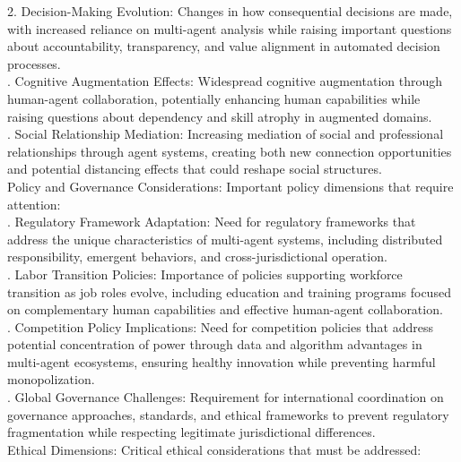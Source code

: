 2. Decision-Making Evolution: Changes in how consequential decisions are made, with increased reliance on multi-agent analysis while raising important questions about accountability, transparency, and value alignment in automated decision processes.\\ . Cognitive Augmentation Effects: Widespread cognitive augmentation through human-agent collaboration, potentially enhancing human capabilities while raising questions about dependency and skill atrophy in augmented domains.\\ . Social Relationship Mediation: Increasing mediation of social and professional relationships through agent systems, creating both new connection opportunities and potential distancing effects that could reshape social structures.\\ \newline
Policy and Governance Considerations: Important policy dimensions that require attention:\\ . Regulatory Framework Adaptation: Need for regulatory frameworks that address the unique characteristics of multi-agent systems, including distributed responsibility, emergent behaviors, and cross-jurisdictional operation.\\ . Labor Transition Policies: Importance of policies supporting workforce transition as job roles evolve, including education and training programs focused on complementary human capabilities and effective human-agent collaboration.\\ . Competition Policy Implications: Need for competition policies that address potential concentration of power through data and algorithm advantages in multi-agent ecosystems, ensuring healthy innovation while preventing harmful monopolization.\\ . Global Governance Challenges: Requirement for international coordination on governance approaches, standards, and ethical frameworks to prevent regulatory fragmentation while respecting legitimate jurisdictional differences.\\ \newline
Ethical Dimensions: Critical ethical considerations that must be addressed:\\ \newline
